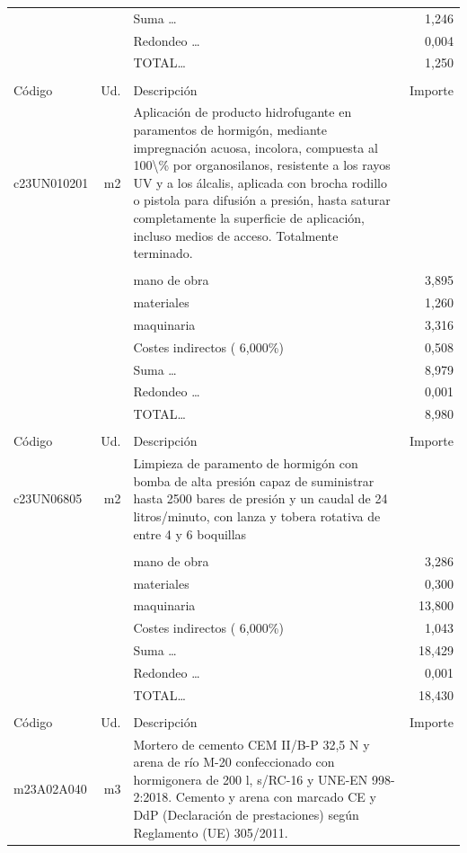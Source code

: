 \documentclass{book}%
\begin{document}
\begin{supertabular}{l r p{60mm} r}
&&Suma \ldots&     1,246\\%
&&Redondeo \ldots&     0,004\\%
%
&&TOTAL\ldots&     1,250\\%
&&&\\%
Código&Ud.&Descripción&Importe\\%
\hline%
c23UN010201&m2&Aplicación de producto hidrofugante en paramentos de hormigón, mediante impregnación acuosa, incolora, compuesta al 100\textbackslash{}\% por organosilanos, resistente a los rayos UV y a los álcalis, aplicada con brocha rodillo o pistola para difusión a presión, hasta saturar completamente la superficie de aplicación, incluso medios de acceso. Totalmente terminado.&\\%
&&&\\%
&&mano de obra&     3,895\\%
&&materiales&     1,260\\%
&&maquinaria&     3,316\\%
&&Costes indirectos (     6,000\%)&     0,508\\%
&&Suma \ldots&     8,979\\%
&&Redondeo \ldots&     0,001\\%
%
&&TOTAL\ldots&     8,980\\%
&&&\\%
Código&Ud.&Descripción&Importe\\%
\hline%
c23UN06805&m2&Limpieza de paramento de hormigón con bomba de alta presión capaz de suministrar hasta 2500 bares de presión y un caudal de 24 litros/minuto, con lanza y tobera rotativa de entre 4 y 6 boquillas&\\%
&&&\\%
&&mano de obra&     3,286\\%
&&materiales&     0,300\\%
&&maquinaria&    13,800\\%
&&Costes indirectos (     6,000\%)&     1,043\\%
&&Suma \ldots&    18,429\\%
&&Redondeo \ldots&     0,001\\%
%
&&TOTAL\ldots&    18,430\\%
&&&\\%
Código&Ud.&Descripción&Importe\\%
\hline%
m23A02A040&m3&Mortero de cemento CEM II/B{-}P 32,5 N y arena de río M{-}20 confeccionado con hormigonera de 200 l, s/RC{-}16 y UNE{-}EN 998{-}2:2018. Cemento y arena con marcado CE y DdP (Declaración de prestaciones) según Reglamento (UE) 305/2011.&\\%

\end{supertabular}
\end{document}
